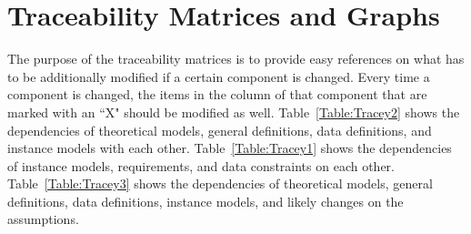 \documentclass[12pt]{article}
\begin{document}
\section{Traceability Matrices and Graphs}
\label{Sec:TraceMatrices}
The purpose of the traceability matrices is to provide easy references on what has to be additionally modified if a certain component is changed. Every time a component is changed, the items in the column of that component that are marked with an ``X" should be modified as well. Table~\ref{Table:Tracey2} shows the dependencies of theoretical models, general definitions, data definitions, and instance models with each other. Table~\ref{Table:Tracey1} shows the dependencies of instance models, requirements, and data constraints on each other. Table~\ref{Table:Tracey3} shows the dependencies of theoretical models, general definitions, data definitions, instance models, and likely changes on the assumptions.
\end{document}
